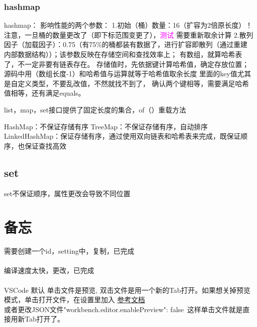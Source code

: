 \documentclass[12pt]{ctexart}
\begin{document}
\subsubsection{hashmap}
hashmap：
影响性能的两个参数：
1.初始（桶）数量：16（扩容为2倍原长度）！注意，一旦桶的数量更改了（即下标范围变更了），\textcolor{magenta}{测试} 需要重新取余计算
2.散列因子（加载因子）：0.75（有75\%的桶都装有数据了，进行扩容即散列（通过重建内部数据结构））；该参数反映在存储空间和查找效率上；
有数组，就算哈希表了，不一定非要有链表存在。
存储值时，先依据键计算哈希值，确定存放位置；
源码中用（数组长度-1）和哈希值与运算就等于哈希值取余长度
里面的key值尤其是自定义类型，不要乱改值，不然就找不到了，
确认两个键相等，需要满足哈希值相等，还有满足equals。


list，map，set接口提供了固定长度的集合，of（）重载方法

HashMap：不保证存储有序
TreeMap：不保证存储有序，自动排序
LinkedHashMap：保证存储有序，通过使用双向链表和哈希表来完成，既保证顺序，也保证查找高效

\subsection{set}
set不保证顺序，属性更改会导致不同位置

\section{备忘}
需要创建一个id，setting中，复制，已完成\paragraph{}
编译速度太快，更改，已完成\paragraph{}
VSCode 默认 单击文件是预览, 双击文件是用一个新的Tab打开。如果想关掉预览模式，单击打开文件，在设置里加入
\href{https://blog.csdn.net/qq_41865652/article/details/107024390}{参考文档}\\
或者更改JSON文件"workbench.editor.enablePreview": false\ 这样单击文件就是直接用新Tab打开了。
\end{document}
